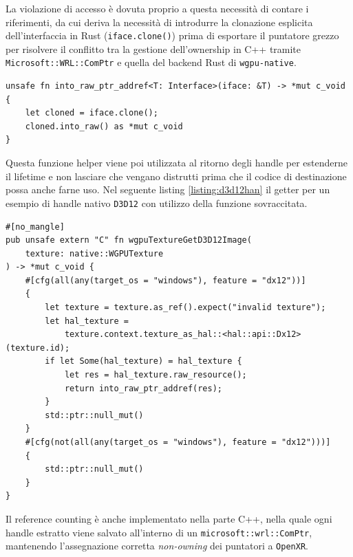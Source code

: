 \documentclass[a4paper, 11pt, twoside]{report}
\begin{document}
La violazione di accesso è dovuta proprio a questa necessità di contare i riferimenti, da cui deriva la necessità di
introdurre la clonazione esplicita dell'interfaccia in Rust (\texttt{iface.clone()}) prima di esportare il puntatore
grezzo per risolvere il conflitto tra la gestione dell'ownership in C++ tramite \texttt{Microsoft::WRL::ComPtr} e quella
del backend Rust di \texttt{wgpu-native}.

\begin{listing}[!ht]
\begin{verbatim}
unsafe fn into_raw_ptr_addref<T: Interface>(iface: &T) -> *mut c_void {
    let cloned = iface.clone();
    cloned.into_raw() as *mut c_void
}
\end{verbatim}
\vspace{-0.75cm}
\caption{Reference Counting per il ritorno di Handle nativi}
\label{listing:refcnt}
\end{listing}

Questa funzione helper viene poi utilizzata al ritorno degli handle per estenderne il lifetime e non lasciare che
vengano distrutti prima che il codice di destinazione possa anche farne uso. Nel seguente listing \ref{listing:d3d12han}
il getter per un esempio di handle nativo \texttt{D3D12} con utilizzo della funzione sovraccitata.

\begin{listing}[!ht]
\begin{verbatim}
#[no_mangle]
pub unsafe extern "C" fn wgpuTextureGetD3D12Image(
    texture: native::WGPUTexture
) -> *mut c_void {
    #[cfg(all(any(target_os = "windows"), feature = "dx12"))]
    {
        let texture = texture.as_ref().expect("invalid texture");
        let hal_texture =
            texture.context.texture_as_hal::<hal::api::Dx12>(texture.id);
        if let Some(hal_texture) = hal_texture {
            let res = hal_texture.raw_resource();
            return into_raw_ptr_addref(res);
        }
        std::ptr::null_mut()
    }
    #[cfg(not(all(any(target_os = "windows"), feature = "dx12")))]
    {
        std::ptr::null_mut()
    }
}
\end{verbatim}
\vspace{-0.75cm}
\caption{Funzione di recupero degli handle D3D12}
\label{listing:d3d12han}
\end{listing}

Il reference counting è anche implementato nella parte C++, nella quale ogni handle estratto viene salvato all'interno
di un \texttt{microsoft::wrl::ComPtr}, mantenendo l'assegnazione corretta \textit{non-owning} dei puntatori a
\texttt{\gls{OpenXR}}.
\end{document}

